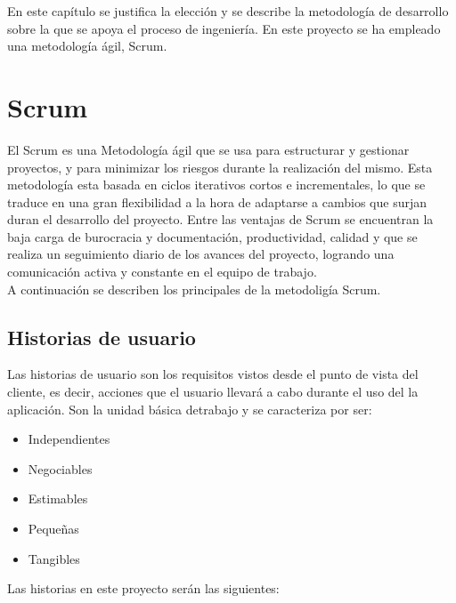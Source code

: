 En este capítulo se justifica la elección y se describe la metodología de desarrollo sobre la que se apoya el proceso de ingeniería. En este proyecto se ha empleado una metodología ágil, Scrum. 



\section{Scrum}

El Scrum es una  Metodología ágil \cite{6} \cite{9} que se usa para estructurar y gestionar proyectos, y para minimizar los riesgos durante la realización del mismo.
Esta metodología esta basada en ciclos iterativos cortos e incrementales, lo que se traduce en una gran flexibilidad a la hora de adaptarse a cambios que surjan duran el desarrollo del proyecto.
Entre las ventajas de Scrum se encuentran la baja carga de burocracia y documentación, productividad, calidad y que se realiza un seguimiento diario de los avances del proyecto, logrando una comunicación activa y constante en el equipo de trabajo.\\
A continuación se describen los principales  de la metodoligía Scrum.


\subsection{Historias de usuario}
Las historias de usuario son los requisitos vistos desde el punto de vista del cliente, es decir, acciones que el usuario llevará a cabo durante el uso del la aplicación. Son la unidad básica detrabajo y se caracteriza por ser:
\begin{itemize}
\item Independientes
 \item Negociables
  \item Estimables
  \item Pequeñas
   \item Tangibles
    
\end{itemize}

Las historias en este proyecto serán las siguientes:


